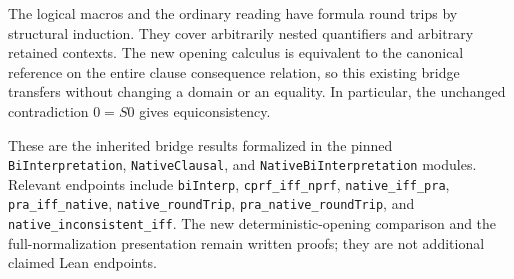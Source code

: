 The logical macros and the ordinary reading have formula round trips by
structural induction.  They cover arbitrarily nested quantifiers and
arbitrary retained contexts.  The new opening calculus is equivalent to
the canonical reference on the entire clause consequence relation, so
this existing bridge transfers without changing a domain or an equality.
In particular, the unchanged contradiction $0=S0$ gives equiconsistency.

These are the inherited bridge results formalized in the pinned
\texttt{BiInterpretation}, \texttt{NativeClausal}, and
\texttt{NativeBiInterpretation} modules.\cite{native} Relevant endpoints include
\texttt{biInterp}, \texttt{cprf\_iff\_nprf},
\texttt{native\_iff\_pra}, \texttt{pra\_iff\_native},
\texttt{native\_roundTrip}, \texttt{pra\_native\_roundTrip}, and
\texttt{native\_inconsistent\_iff}.  The new deterministic-opening
comparison and the full-normalization presentation remain written proofs;
they are not additional claimed Lean endpoints.

